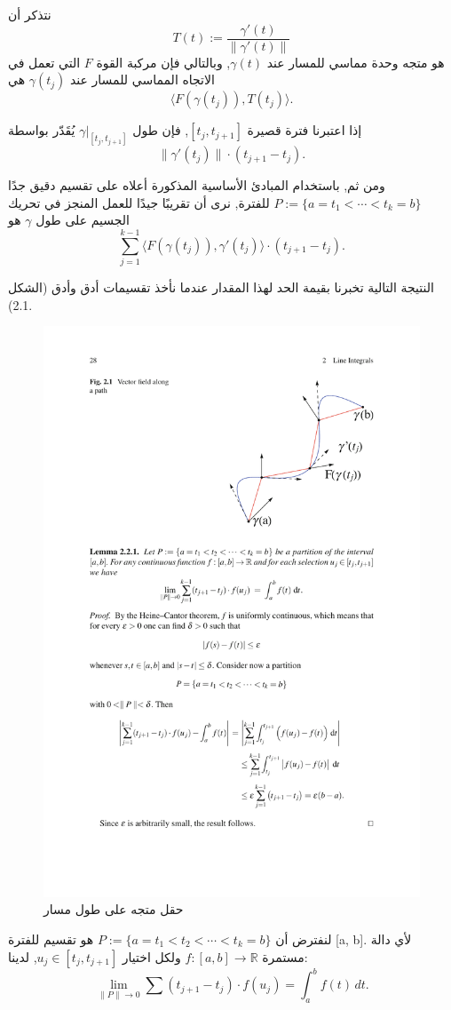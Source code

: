 نتذكر أن
\[ T(t) := \frac{\gamma'(t)}{\|\gamma'(t)\|} \]
هو متجه وحدة مماسي للمسار عند \( \gamma(t) \), وبالتالي فإن مركبة القوة \( F \) التي تعمل في الاتجاه المماسي للمسار عند \( \gamma(t_j) \) هي
\[ \langle F(\gamma(t_j)), T(t_j) \rangle. \]

إذا اعتبرنا فترة قصيرة \( [t_j, t_{j+1}] \), فإن طول \( \gamma|_{[t_j, t_{j+1}]} \) يُقَدّر بواسطة
\[ \|\gamma'(t_j)\| \cdot (t_{j+1} - t_j). \]

ومن ثم, باستخدام المبادئ الأساسية المذكورة أعلاه على تقسيم دقيق جدًا \( P := \{a = t_1 < \cdots < t_k = b\} \) للفترة, نرى أن تقريبًا جيدًا للعمل المنجز في تحريك الجسيم على طول \( \gamma \) هو
\[ \sum_{j=1}^{k-1} \langle F(\gamma(t_j)), \gamma'(t_j) \rangle \cdot (t_{j+1} - t_j). \]

النتيجة التالية تخبرنا بقيمة الحد لهذا المقدار عندما نأخذ تقسيمات أدق وأدق (الشكل 2.1).

\begin{figure}
    \centering
    \includegraphics[width=0.6\linewidth]{vector_field_along_path.pdf}
    \caption{حقل متجه على طول مسار}
    \label{fig:enter-label}
\end{figure}
\begin{lemma}

لنفترض أن \( P := \{a = t_1 < t_2 < \cdots < t_k = b\} \) هو تقسيم للفترة [a, b]. لأي دالة مستمرة \( f : [a, b] \to \mathbb{R} \) ولكل اختيار \( u_j \in [t_j, t_{j+1}] \), لدينا:
\[ \lim_{ \|P\| \to 0 } \sum (t_{j+1} - t_j) \cdot f(u_j) = \int_a^b f(t) \, dt. \]

\end{lemma}

